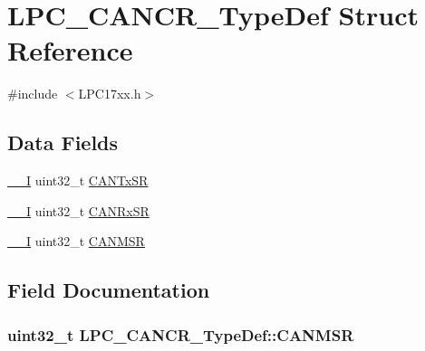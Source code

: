 \hypertarget{structLPC__CANCR__TypeDef}{}\section{L\+P\+C\+\_\+\+C\+A\+N\+C\+R\+\_\+\+Type\+Def Struct Reference}
\label{structLPC__CANCR__TypeDef}


{\ttfamily \#include $<$L\+P\+C17xx.\+h$>$}

\subsection*{Data Fields}
\begin{DoxyCompactItemize}
\item 
\hyperlink{LPC17xx_8h_af63697ed9952cc71e1225efe205f6cd3}{\+\_\+\+\_\+I} uint32\+\_\+t \hyperlink{structLPC__CANCR__TypeDef_a8b38016c4e2b002c08b429c1c5782d74}{C\+A\+N\+Tx\+SR}
\item 
\hyperlink{LPC17xx_8h_af63697ed9952cc71e1225efe205f6cd3}{\+\_\+\+\_\+I} uint32\+\_\+t \hyperlink{structLPC__CANCR__TypeDef_abd917011d5f82b5f4f14d4a5d34581b5}{C\+A\+N\+Rx\+SR}
\item 
\hyperlink{LPC17xx_8h_af63697ed9952cc71e1225efe205f6cd3}{\+\_\+\+\_\+I} uint32\+\_\+t \hyperlink{structLPC__CANCR__TypeDef_a0c84a71ed3701140f202c1864d0e8b0b}{C\+A\+N\+M\+SR}
\end{DoxyCompactItemize}


\subsection{Field Documentation}
\subsubsection[{\texorpdfstring{C\+A\+N\+M\+SR}{CANMSR}}]{ uint32\+\_\+t L\+P\+C\+\_\+\+C\+A\+N\+C\+R\+\_\+\+Type\+Def\+::\+C\+A\+N\+M\+SR}\hypertarget{structLPC__CANCR__TypeDef_a0c84a71ed3701140f202c1864d0e8b0b}{}\label{structLPC__CANCR__TypeDef_a0c84a71ed3701140f202c1864d0e8b0b}
